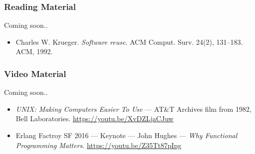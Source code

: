 \begin{frame}

\frametitle{Reading Material}

\begin{center}

Coming soon..

\end{center}

\footnotesize

\begin{itemize}

\item Charles W. Krueger. \emph{Software reuse}. ACM Comput. Surv. 24(2),
131--183. ACM, 1992.

\end{itemize}

\end{frame}


\begin{frame}

\frametitle{Video Material}

\begin{center}

Coming soon..

\end{center}

\footnotesize

\begin{itemize}

\item \emph{UNIX: Making Computers Easier To Use} --- AT\&T Archives film from
1982, Bell Laboratories. \url{https://youtu.be/XvDZLjaCJuw}

\item Erlang Factroy SF 2016 --- Keynote --- John Hughes --- \emph{Why
Functional Programming Matters}. \url{https://youtu.be/Z35Tt87pIpg}

\end{itemize}

\end{frame}
